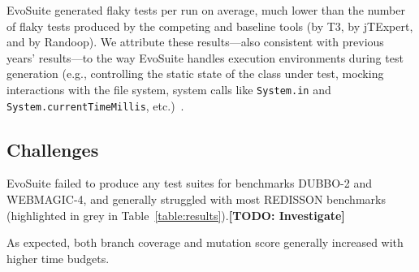 \documentclass[sigconf,table]{acmart}
\newcommand{\TODO}[1]{\textbf{\textcolor{ScarletRed}{[TODO: #1]}}\xspace}
\newcommand{\TODO}[1]{}
\newcommand{\EVOSUITE}{{\sc EvoSuite}\xspace}
\newcommand{\JTEXPERT}{{\sc jTExpert}\xspace}
\newcommand{\RANDOOP}{{\sc Randoop}\xspace}
\newcommand{\TT}{{\sc T3}\xspace}
\begin{document}


\EVOSUITE generated \FlakyEvosuite flaky tests per run on average,
much lower than the number of flaky tests produced by the competing
and baseline tools (\FlakyTthree by \TT, \FlakyJtexpert by \JTEXPERT,
and \FlakyRandoop by \RANDOOP). We attribute these results---also
consistent with previous years' results---to the way \EVOSUITE handles
execution environments during test generation (e.g., controlling the
static state of the class under test, mocking interactions with the
file system, system calls like \texttt{System.in} and
\texttt{System.currentTimeMillis}, etc.)~\cite{arcuri2014automated}.


\subsection{Challenges}

\EVOSUITE failed to produce any test suites for benchmarks DUBBO-2 and
WEBMAGIC-4, and generally struggled with most REDISSON benchmarks
(highlighted in grey in Table~\ref{table:results}).\TODO{Investigate}


As expected, both branch coverage and mutation score generally
increased with higher time budgets.

\end{document}
